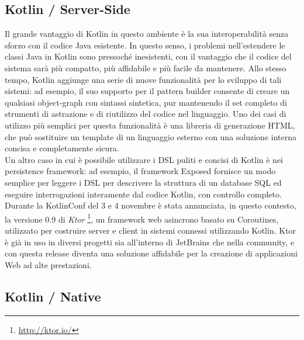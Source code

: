 \subsection{Kotlin / Server-Side}

Il grande vantaggio di Kotlin in questo ambiente è la sua interoperabilità senza sforzo con il codice Java esistente. In questo senso, i problemi nell’estendere le classi Java in Kotlin sono pressoché inesistenti, con il vantaggio che il codice del sistema sarà più compatto, più affidabile e più facile da mantenere. Allo stesso tempo, Kotlin aggiunge una serie di nuove funzionalità per lo sviluppo di tali sistemi: ad esempio, il suo supporto per il pattern builder consente di creare un qualsiasi object-graph con sintassi sintetica, pur mantenendo il set completo di strumenti di astrazione e di riutilizzo del codice nel linguaggio. Uno dei casi di utilizzo più semplici per questa funzionalità è una libreria di generazione HTML, che può sostituire un template di un linguaggio esterno con una soluzione interna concisa e completamente sicura.\\
Un altro caso in cui è possibile utilizzare i DSL puliti e concisi di Kotlin è nei persistence framework: ad esempio, il framework Exposed fornisce un modo semplice per leggere i DSL per descrivere la struttura di un database SQL ed eseguire interrogazioni interamente dal codice Kotlin, con controllo completo.\\
Durante la KotlinConf del 3 e 4 novembre è stata annunciata, in questo contesto, la versione 0.9 di {\em Ktor} \footnote{\url{http://ktor.io/}}, un framework web asincrono basato su Coroutines, utilizzato per costruire server e client in sistemi connessi utilizzando Kotlin. Ktor è già in uso in diversi progetti sia all'interno di JetBrains che nella community, e con questa release diventa una soluzione affidabile per la creazione di applicazioni Web ad alte prestazioni.\\

\subsection{Kotlin / Native}

